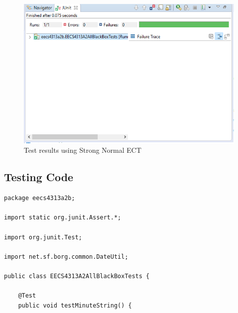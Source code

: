 \documentclass[fontsize=12pt,paper=letter,twoside]{scrartcl}
\begin{document}
\begin{itemize}
\begin{figure}[!htb]
\begin{center}
\includegraphics[width=.99\textwidth]{images/bbt/bbt_ect.png}
\end{center}
\caption{Test results using Strong Normal ECT}
\label{fig:bbt_ect}
\end{figure}

\newpage
\subsection{Testing Code}
\begin{lstlisting}
package eecs4313a2b;

import static org.junit.Assert.*;

import org.junit.Test;

import net.sf.borg.common.DateUtil;

public class EECS4313A2AllBlackBoxTests {

	@Test
	public void testMinuteString() {


\end{lstlisting}
\end{itemize}
\end{document}
